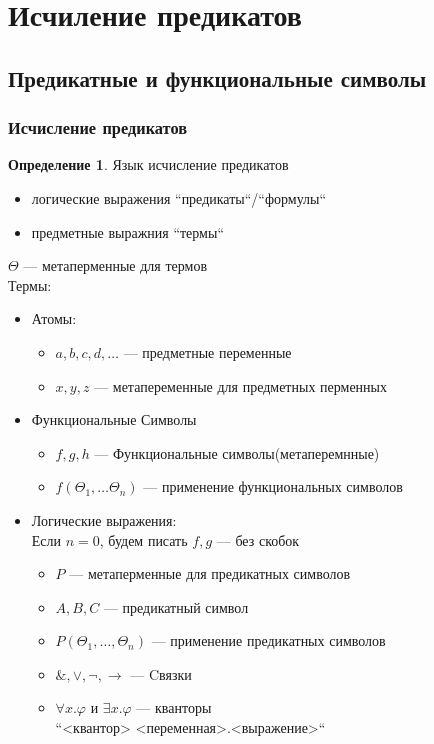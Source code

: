 \documentclass[english]{article}
\theoremstyle{plain}
\theoremstyle{remark}
\theoremstyle{definition}
\newtheorem*{definition}{Определение}
\begin{document}
\section{Исчиление предикатов}
\label{sec:orge788205}
\subsection{Предикатные и функциональные символы}
\label{sec:org70ab2c0}
\subsubsection{Исчисление предикатов}
\label{sec:orgb8d25ff}
\begin{definition}
Язык исчисление предикатов
\begin{itemize}
\item логические выражения ``предикаты``/``формулы``
\item предметные выражния ``термы``
\end{itemize}
\(\Theta\) --- метаперменные для термов \\
Термы:
\begin{itemize}
\item Атомы:
\begin{itemize}
\item \(a, b, c, d, \dots\) --- предметные переменные
\item \(x, y, z\) --- метапеременные для предметных перменных
\end{itemize}
\item Функциональные Символы
\begin{itemize}
\item \(f, g, h\) --- Функциональные символы(метаперемнные)
\item \(f(\Theta_1, \dots \Theta_n)\) --- применение функциональных символов
\end{itemize}
\item Логические выражения: \\
\color{gray}Если \(n = 0\), будем писать \(f, g\) --- без скобок\color{black}
\begin{itemize}
\item \(P\) --- метаперменные для предикатных символов
\item \(A, B, C\) --- предикатный символ
\item \(P(\Theta_1, \dots, \Theta_n)\) --- применение предикатных символов
\item \(\&, \vee, \neg, \to\) --- Cвязки
\item \(\forall x.\varphi\) и \(\exists x.\varphi\) --- кванторы \\
\color{gray}``<квантор> <переменная>.<выражение>``\color{black} \\
\end{itemize}
\end{itemize}
\end{definition}
\end{document}
